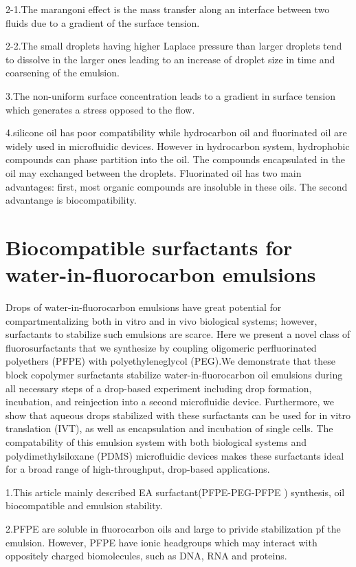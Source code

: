 \documentclass{article}
\begin{document}
2-1.The marangoni effect is the mass transfer along an interface between two fluids due to a gradient of the surface tension. 

2-2.The small droplets having higher Laplace pressure than larger droplets tend to dissolve in the larger ones leading to an increase of droplet size in time and coarsening of the emulsion.

3.The non-uniform surface concentration leads to a gradient in surface tension which generates a stress opposed to the flow.

4.silicone oil has poor compatibility while hydrocarbon oil and fluorinated oil are widely used in microfluidic devices. However in hydrocarbon system, hydrophobic compounds can phase partition into the oil. The compounds encapsulated in the oil may exchanged between the droplets. Fluorinated oil  has two main advantages: first, most organic compounds are insoluble in these oils. The second advantange is biocompatibility.

\part{Biocompatible surfactants for water-in-fluorocarbon emulsions}

Drops of water-in-fluorocarbon emulsions have great potential for compartmentalizing both in vitro and in vivo biological systems; however, surfactants to stabilize such emulsions are scarce. Here we present a novel class of fluorosurfactants that we synthesize by coupling oligomeric perfluorinated polyethers (PFPE) with polyethyleneglycol (PEG).We demonstrate that these block copolymer surfactants stabilize water-in-fluorocarbon oil emulsions during all necessary steps of a drop-based experiment including drop formation, incubation, and reinjection into a second microfluidic device. Furthermore, we show that aqueous drops stabilized with these surfactants can be used for in vitro translation (IVT), as well as encapsulation and incubation of single cells. The compatability of this emulsion system with both biological systems and polydimethylsiloxane (PDMS) microfluidic devices makes these surfactants ideal for a broad range of high-throughput, drop-based applications.

1.This article mainly described EA surfactant(PFPE-PEG-PFPE ) synthesis, oil biocompatible and emulsion stability.

2.PFPE are soluble in fluorocarbon oils and large to privide stabilization pf the emulsion. However, PFPE have ionic headgroups which may interact with oppositely charged biomolecules, such as DNA, RNA and proteins.
\end{document}
